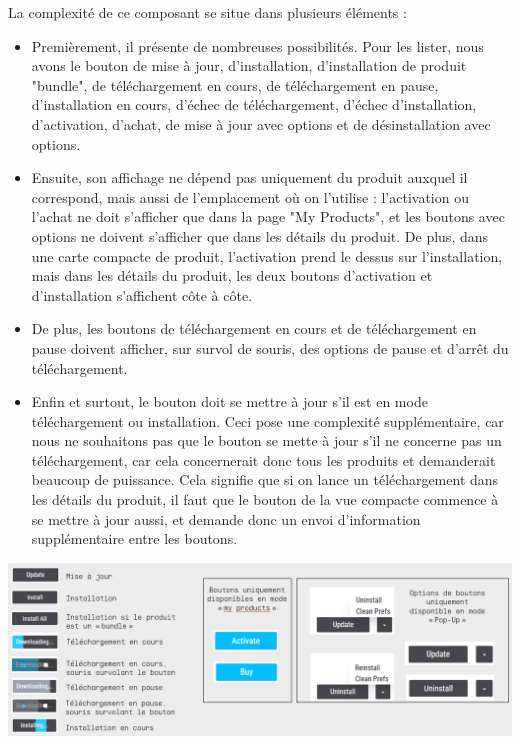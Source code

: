 \documentclass[francais]{rapportPFE}  %
\begin{document}
La complexité de ce composant se situe dans plusieurs éléments :
\begin{itemize}
    \item Premièrement, il présente de nombreuses possibilités. Pour les lister, nous avons le bouton de mise à jour, d'installation, d'installation de produit "bundle", de téléchargement en cours, de téléchargement en pause, d'installation en cours, d'échec de téléchargement, d'échec d'installation, d'activation, d'achat, de mise à jour avec options et de désinstallation avec options.
    \item Ensuite, son affichage ne dépend pas uniquement du produit auxquel il correspond, mais aussi de l'emplacement où on l'utilise : l'activation ou l'achat ne doit s'afficher que dans la page "My Products", et les boutons avec options ne doivent s'afficher que dans les détails du produit. De plus, dans une carte compacte de produit, l'activation prend le dessus sur l'installation, mais dans les détails du produit, les deux boutons d'activation et d'installation s'affichent côte à côte.
    \item De plus, les boutons de téléchargement en cours et de téléchargement en pause doivent afficher, sur survol de souris, des options de pause et d'arrêt du téléchargement.
    \item Enfin et surtout, le bouton doit se mettre à jour s'il est en mode téléchargement ou installation. Ceci pose une complexité supplémentaire, car nous ne souhaitons pas que le bouton se mette à jour s'il ne concerne pas un téléchargement, car cela concernerait donc tous les produits et demanderait beaucoup de puissance. Cela signifie que si on lance un téléchargement dans les détails du produit, il faut que le bouton de la vue compacte commence à se mettre à jour aussi, et demande donc un envoi d'information supplémentaire entre les boutons.
\end{itemize}

\begin{center}
    \centering
    \includegraphics[width=1\textwidth]{graphics/boutons.png}
    \label{fig:test1}
\end{center}
\end{document}
